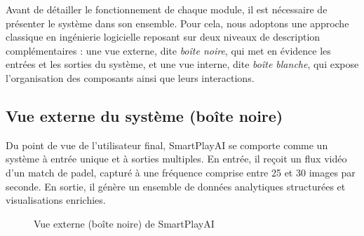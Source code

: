 Avant de détailler le fonctionnement de chaque module, il est nécessaire de présenter le système dans son ensemble. Pour cela, nous adoptons une approche classique en ingénierie logicielle reposant sur deux niveaux de description complémentaires : une vue externe, dite \textit{boîte noire}, qui met en évidence les entrées et les sorties du système, et une vue interne, dite \textit{boîte blanche}, qui expose l’organisation des composants ainsi que leurs interactions.

\subsection{Vue externe du système (boîte noire)}

Du point de vue de l’utilisateur final, SmartPlayAI se comporte comme un système à entrée unique et à sorties multiples. En entrée, il reçoit un flux vidéo d’un match de padel, capturé à une fréquence comprise entre 25 et 30 images par seconde. En sortie, il génère un ensemble de données analytiques structurées et visualisations enrichies.

\begin{figure}[H]
    \centering
    \caption{Vue externe (boîte noire) de SmartPlayAI}
    \label{fig:blackbox-smartplayai}
\end{figure}

